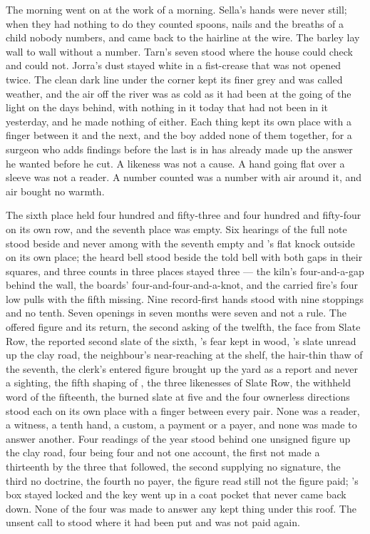The morning went on at the work of a morning. Sella's hands were never still; when they had nothing to do they counted spoons, nails and the breaths of a child nobody numbers, and came back to the hairline at the wire. The barley lay wall to wall without a number. Tarn's seven stood where the house could check and could not. Jorra's dust stayed white in a fist-crease that was not opened twice. The clean dark line under the corner kept its finer grey and was called weather, and the air off the river was as cold as it had been at the going of the light on the days behind, with nothing in it today that had not been in it yesterday, and he made nothing of either. Each thing kept its own place with a finger between it and the next, and the boy added none of them together, for a surgeon who adds findings before the last is in has already made up the answer he wanted before he cut. A likeness was not a cause. A hand going flat over a sleeve was not a reader. A number counted was a number with air around it, and air bought no warmth.

The sixth place held four hundred and fifty-three and four hundred and fifty-four on its own row, and the seventh place was empty. Six hearings of the full note stood beside and never among with the seventh empty and 's flat knock outside on its own place; the heard bell stood beside the told bell with both gaps in their squares, and three counts in three places stayed three --- the kiln's four-and-a-gap behind the wall, the boards' four-and-four-and-a-knot, and the carried fire's four low pulls with the fifth missing. Nine record-first hands stood with nine stoppings and no tenth. Seven openings in seven months were seven and not a rule. The offered figure and its return, the second asking of the twelfth, the face from Slate Row, the reported second slate of the sixth, 's fear kept in wood, 's slate unread up the clay road, the neighbour's near-reaching at the shelf, the hair-thin thaw of the seventh, the clerk's entered figure brought up the yard as a report and never a sighting, the fifth shaping of , the three likenesses of Slate Row, the withheld word of the fifteenth, the burned slate at five and the four ownerless directions stood each on its own place with a finger between every pair. None was a reader, a witness, a tenth hand, a custom, a payment or a payer, and none was made to answer another. Four readings of the year stood behind one unsigned figure up the clay road, four being four and not one account, the first not made a thirteenth by the three that followed, the second supplying no signature, the third no doctrine, the fourth no payer, the figure read still not the figure paid; 's box stayed locked and the key went up in a coat pocket that never came back down. None of the four was made to answer any kept thing under this roof. The unsent call to  stood where it had been put and was not paid again.

